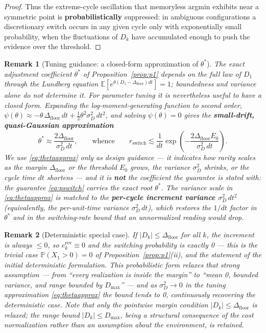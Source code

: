 \documentclass[11pt]{article}
\newtheorem{remark}{Remark}
\newcommand{\Dfloor}{\Delta_{\text{floor}}}
\newcommand{\Erev}{e^{\text{rev}}}
\begin{document}
\begin{proof}
Thus the extreme-cycle oscillation that memoryless argmin exhibits near a symmetric point is \textbf{probabilistically} suppressed: in ambiguous configurations a discretionary switch occurs in any given cycle only with exponentially small probability, when the fluctuations of $D_k$ have accumulated enough to push the evidence over the threshold.
\end{proof}

\begin{remark}[Tuning guidance: a closed-form approximation of $\theta^*$] \label{rem:tuning}
The exact adjustment coefficient $\theta^*$ of Proposition~\ref{prop:p1} depends on the full law of $D_1$ through the Lundberg equation $\mathbb{E}[e^{\theta (D_1-\Dfloor)dt}] = 1$; boundedness and variance alone do not determine it. For parameter tuning it is nevertheless useful to have a closed form. Expanding the log-moment-generating function to second order, $\psi(\theta) \approx -\theta\,\Dfloor\,dt + \tfrac{1}{2}\theta^2 \sigma_D^2\, dt^2$, and solving $\psi(\theta) = 0$ gives the \textbf{small-drift, quasi-Gaussian approximation}
\begin{equation}
\theta^* \approx \frac{2\Dfloor}{\sigma_D^2\, dt},
\qquad\text{whence}\qquad
r_{\text{switch}} \lesssim \frac{1}{dt} \exp\!\left(-\frac{2\Dfloor E_0}{\sigma_D^2\, dt}\right).
\label{eq:thetaapprox}
\end{equation}
We use \eqref{eq:thetaapprox} \emph{only} as design guidance --- it indicates how rarity scales as the margin $\Dfloor$ or the threshold $E_0$ grows, the variance $\sigma_D^2$ shrinks, or the cycle time $dt$ shortens --- and it is \textbf{not} the coefficient the guarantee is stated with: the guarantee \eqref{eq:pswitch} carries the exact root $\theta^*$. The variance scale in \eqref{eq:thetaapprox} is matched to the \textbf{per-cycle increment variance $\sigma_D^2\,dt^2$} (equivalently, the per-unit-time variance $\sigma_D^2\,dt$), which restores the $1/dt$ factor in $\theta^*$ and in the switching-rate bound that an unnormalized reading would drop.
\end{remark}

\begin{remark}[Deterministic special case]
If $|D_k| \le \Dfloor$ for all $k$, the increment is always $\le 0$, so $\Erev_k \equiv 0$ and the switching probability is exactly 0 --- this is the trivial case $\mathbb{P}(X_1 > 0) = 0$ of Proposition~\ref{prop:p1}(ii), and the statement of the initial deterministic formulation. This probabilistic form relaxes that strong assumption --- from ``every realization is inside the margin'' to ``mean 0, bounded variance, and range bounded by $D_{\max}$'' --- and as $\sigma_D^2 \to 0$ in the tuning approximation \eqref{eq:thetaapprox} the bound tends to 0, continuously recovering the deterministic case. Note that only the pointwise margin condition $|D_k| \le \Dfloor$ is relaxed; the range bound $|D_k| \le D_{\max}$, being a structural consequence of the cost normalization rather than an assumption about the environment, is retained.
\end{remark}
\end{document}
